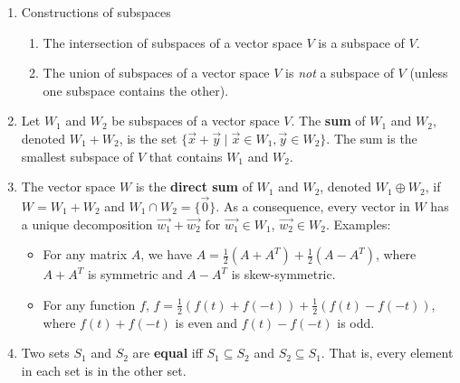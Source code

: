 \documentclass[10pt]{article}
\begin{document}
\begin{multicols*}{2}
\begin{enumerate}
\begin{enumerate}
        \item Constructions of subspaces
        \begin{enumerate}
            \item The intersection of subspaces of a vector space $V$ is a subspace of $V$. 
            \item The union of subspaces of a vector space $V$ is \textit{not} a subspace of $V$ (unless one subspace contains the other).
        \end{enumerate}
        \item Let $W_1$ and $W_2$ be subspaces of a vector space $V$. The \textbf{sum} of $W_1$ and $W_2$, denoted $W_1 + W_2$, is the set $\{\vec{x}+\vec{y} \mid \vec{x} \in W_1, \vec{y} \in W_2\}$. The sum is the smallest subspace of $V$ that contains $W_1$ and $W_2$.
        \item The vector space $W$ is the \textbf{direct sum} of $W_1$ and $W_2$, denoted $W_1 \oplus W_2$, if $W = W_1 + W_2$ and $W_1 \cap W_2 = \{ \vec{0} \}$. As a consequence, every vector in $W$ has a unique decomposition $\vec{w_1} + \vec{w_2}$ for $\vec{w_1} \in W_1$, $\vec{w_2} \in W_2$. Examples:
        \begin{itemize}
            \item For any matrix $A$, we have $A = \frac{1}{2}(A + A^T) + \frac{1}{2}(A - A^T)$, where $A + A^T$ is symmetric and $A - A^T$ is skew-symmetric.
            \item For any function $f$, $f= \frac{1}{2} (f(t) + f(-t)) + \frac{1}{2}(f(t) - f(-t))$, where $f(t) + f(-t)$ is even and $f(t) - f(-t)$ is odd.
        \end{itemize}
        \item Two sets $S_1$ and $S_2$ are \textbf{equal} iff $S_1 \subseteq S_2$ and $S_2 \subseteq S_1$. That is, every element in each set is in the other set.
    \end{enumerate}
    

\end{enumerate}
\end{multicols*}
\end{document}
